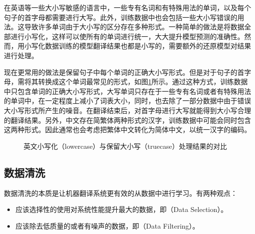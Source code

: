 \parinterval 在英语等一些大小写敏感的语言中，一些专有名词和有特殊用法的单词，以及每个句子的首字母都需要进行大写。此外，训练数据中也会包括一些大小写错误的用法。这导致许多单词由于大小写的区分存在多种形式。一种简单的做法是将数据全部进行小写化，这样可以使所有的单词进行统一，大大提升模型预测的准确性。然而，用小写化数据训练的模型翻译结果也都是小写的，需要额外的还原模型对结果进行处理。

\parinterval 现在更常用的做法是保留句子中每个单词的正确大小写形式。但是对于句子的首字母，需将其转换成这个单词最常见的形式，如图\ref{fig:7-5}所示。通过这种方式，训练数据中只包含单词的正确大小写形式，大写单词只存在于一些专有名词或者有特殊用法的单词中，在一定程度上减小了词表大小，同时，也去除了一部分数据中由于错误大小写形式所产生的噪音。在翻译结束后，对首字母进行大写就能得到大小写合理的翻译结果。另外，中文存在简繁体两种形式的汉字，训练数据中可能会同时包含这两种形式。因此通常也会考虑把繁体中文转化为简体中文，以统一汉字的编码。

\begin{figure}[htp]
\centering

\caption{英文小写化（lowercase）与保留大小写（truecase）处理结果的对比}
\label{fig:7-5}
\end{figure}


\subsection{数据清洗}
\label{chapter7.2.3}
\parinterval 数据清洗的本质是让机器翻译系统更有效的从数据中进行学习。有两种观点：

\begin{itemize}
\vspace{0.5em}
\item 应该选择性的使用对系统性能提升最大的数据，即{\small{}}（Data Selection）。
\vspace{0.5em}
\item 应该除去低质量的或者有噪声的数据，即{\small{}}（Data Filtering）。
\vspace{0.5em}
\end{itemize}

